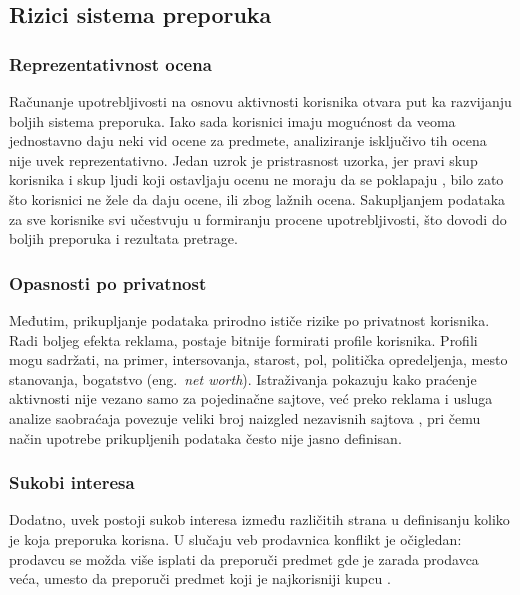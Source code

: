 \documentclass[a4paper]{article}
\begin{document}
\subsection{Rizici sistema preporuka}
\label{subsec:rizici_sistema_preporuka}

\subsubsection{Reprezentativnost ocena}
\label{subsubsec:reprezentativnost_ocena}

Računanje upotrebljivosti na osnovu aktivnosti korisnika otvara put ka razvijanju boljih sistema preporuka. Iako sada korisnici imaju mogućnost da veoma jednostavno daju neki vid ocene za predmete, analiziranje isključivo tih ocena nije uvek reprezentativno. Jedan uzrok je pristrasnost uzorka, jer pravi skup korisnika i skup ljudi koji ostavljaju ocenu ne moraju da se poklapaju \cite{panzeri_sampling_2008}, bilo zato što korisnici ne žele da daju ocene, ili zbog lažnih ocena. Sakupljanjem podataka za sve korisnike svi učestvuju u formiranju procene upotrebljivosti, što dovodi do boljih preporuka i rezultata pretrage.

\subsubsection{Opasnosti po privatnost}
\label{subsubsec:opasnosti_po_privatnost}

Međutim, prikupljanje podataka prirodno ističe rizike po privatnost korisnika. Radi boljeg efekta reklama, postaje bitnije formirati profile korisnika. Profili mogu sadržati, na primer, intersovanja, starost, pol, politička opredeljenja, mesto stanovanja, bogatstvo (eng.~{\em net worth}). Istraživanja pokazuju kako praćenje aktivnosti nije vezano samo za pojedinačne sajtove, već preko reklama i usluga analize saobraćaja povezuje veliki broj naizgled nezavisnih sajtova \cite{chaabane_big_2012}, pri čemu način upotrebe prikupljenih podataka često nije jasno definisan.

\subsubsection{Sukobi interesa}
\label{subsubsec:sukobi_interesa}

Dodatno, uvek postoji sukob interesa između različitih strana u definisanju koliko je koja preporuka korisna. U slučaju veb prodavnica konflikt je očigledan: prodavcu se možda više isplati da preporuči predmet gde je zarada prodavca veća, umesto da preporuči predmet koji je najkorisniji kupcu \cite{burke_recommender_2011}.
\end{document}
